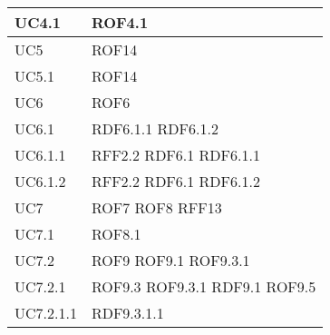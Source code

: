 \documentclass[../AnalisideiRequisiti.tex]{subfiles}
\begin{document}
\begin{longtable}{| p{4cm} | p{4cm} |}
		\hline
		\newline UC4.1 &  \newline ROF4.1 \\[1em]
		\hline
		\newline UC5 &  \newline ROF14 \\[1em]
		\hline
		\newline UC5.1 &  \newline ROF14 \\[1em]
		\hline
		\newline UC6 &  \newline ROF6 \\[1em]
		\hline
		\newline UC6.1 &  \newline RDF6.1.1 \newline RDF6.1.2 \\[1em]
		\hline
		\newline UC6.1.1 &  \newline RFF2.2 \newline RDF6.1 \newline RDF6.1.1 \\[1em]
		\hline
		\newline UC6.1.2 &  \newline RFF2.2 \newline RDF6.1 \newline RDF6.1.2 \\[1em]
		\hline
		\newline UC7 &  \newline ROF7 \newline ROF8 \newline RFF13 \\[1em]
		\hline
		\newline UC7.1 &  \newline ROF8.1 \\[1em]
		\hline
		\newline UC7.2 &  \newline ROF9 \newline ROF9.1 \newline ROF9.3.1 \\[1em]
		\hline
		\newline UC7.2.1 &  \newline ROF9.3 \newline ROF9.3.1 \newline RDF9.1 \newline ROF9.5 \\[1em]
		\hline
		\newline UC7.2.1.1 &  \newline RDF9.3.1.1 \\[1em]

\end{longtable}
\end{document}
